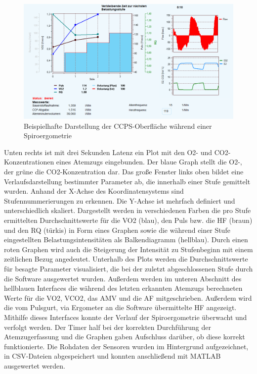 \begin{figure}[H]
	\centering
	\includegraphics[width=\textwidth]{Bilder/sw_screen.png}
	\caption[Software-Oberfläche während einer Spiroergometrie]{Beispielhafte Darstellung der \acs{CCPS}-Oberfläche während einer Spiroergometrie}
	\label{pic:pic12}
\end{figure}

Unten rechts ist mit drei Sekunden Latenz ein Plot mit den \acs{O2}- und \acs{CO2}-Konzentrationen eines Atemzugs eingebunden. Der blaue Graph stellt die \acs{O2}-, der grüne die \acs{CO2}-Konzentration dar. Das große Fenster links oben bildet eine Verlaufsdarstellung bestimmter Parameter ab, die innerhalb einer Stufe gemittelt wurden. Anhand der X-Achse des Koordinatensystems sind Stufennummerierungen zu erkennen. Die Y-Achse ist mehrfach definiert und unterschiedlich skaliert. Dargestellt werden in verschiedenen Farben die pro Stufe ermittelten Durchschnittswerte für die \acs{VO2} (blau), den Puls bzw. die \acs{HF} (braun) und den \acs{RQ} (türkis) in Form eines Graphen sowie die während einer Stufe eingestellten Belastungsintensitäten als Balkendiagramm (hellblau). Durch einen roten Graphen wird auch die Steigerung der Intensität zu Stufenbeginn mit einem zeitlichen Bezug angedeutet. Unterhalb des Plots werden die Durchschnittswerte für besagte Parameter visualisiert, die bei der zuletzt abgeschlossenen Stufe durch die Software ausgewertet wurden. Außerdem werden im unteren Abschnitt des hellblauen Interfaces die während des letzten erkannten Atemzugs berechneten Werte für die \ac{VO2}, \ac{VCO2}, das \ac{AMV} und die \ac{AF} mitgeschrieben. Außerdem wird die vom Pulsgurt, via Ergometer an die Software übermittelte \ac{HF} angezeigt. Mithilfe dieses Interfaces konnte der Verlauf der Spiroergometrie überwacht und verfolgt werden. Der Timer half bei der korrekten Durchführung der Atemzugerfassung und die Graphen gaben Aufschluss darüber, ob diese korrekt funktionierte. Die Rohdaten der Sensoren wurden im Hintergrund aufgezeichnet, in \acs{CSV}-Dateien abgespeichert und konnten anschließend mit MATLAB ausgewertet werden.

